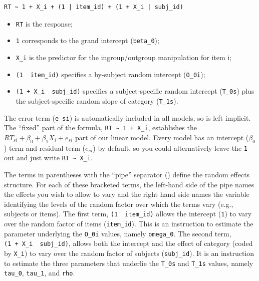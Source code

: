 \documentclass[
  english,
  doc,floatsintext]{apa6}
\providecommand{\tightlist}{%
  \setlength{\itemsep}{0pt}\setlength{\parskip}{0pt}}
\begin{document}
\begin{verbatim}
RT ~ 1 + X_i + (1 | item_id) + (1 + X_i | subj_id)
\end{verbatim}

\begin{itemize}
\tightlist
\item
  \texttt{RT} is the response;
\item
  \texttt{1} corresponds to the grand intercept (\texttt{beta\_0});
\item
  \texttt{X\_i} is the predictor for the ingroup/outgroup manipulation for item i;
\item
  \texttt{(1\ \textbar{}\ item\_id)} specifies a by-subject random intercept (\texttt{O\_0i});
\item
  \texttt{(1\ +\ X\_i\ \textbar{}\ subj\_id)} specifies a subject-specific random intercept (\texttt{T\_0s}) plus the subject-specific random slope of category (\texttt{T\_1s}).
\end{itemize}

\noindent The error term (\texttt{e\_si}) is automatically included in all models, so is left implicit. The \enquote{fixed} part of the formula, \texttt{RT\ \textasciitilde{}\ 1\ +\ X\_i}, establishes the \(RT_{si} + \beta_0 + \beta_1 X_i + e_{si}\) part of our linear model. Every model has an intercept (\(\beta_0\)) term and residual term (\(e_{si}\)) by default, so you could alternatively leave the \texttt{1} out and just write \texttt{RT\ \textasciitilde{}\ X\_i}.

The terms in parentheses with the \enquote{pipe} separator (\texttt{\textbar{}}) define the random effects structure. For each of these bracketed terms, the left-hand side of the pipe names the effects you wish to allow to vary and the right hand side names the variable identifying the levels of the random factor over which the terms vary (e.g., subjects or items). The first term, \texttt{(1\ \textbar{}\ item\_id)} allows the intercept (\texttt{1}) to vary over the random factor of items (\texttt{item\_id}). This is an instruction to estimate the parameter underlying the \texttt{O\_0i} values, namely \texttt{omega\_0}. The second term, \texttt{(1\ +\ X\_i\ \textbar{}\ subj\_id)}, allows both the intercept and the effect of category (coded by \texttt{X\_i}) to vary over the random factor of subjects (\texttt{subj\_id}). It is an instruction to estimate the three parameters that underlie the \texttt{T\_0s} and \texttt{T\_1s} values, namely \texttt{tau\_0}, \texttt{tau\_1}, and \texttt{rho}.
\end{document}
